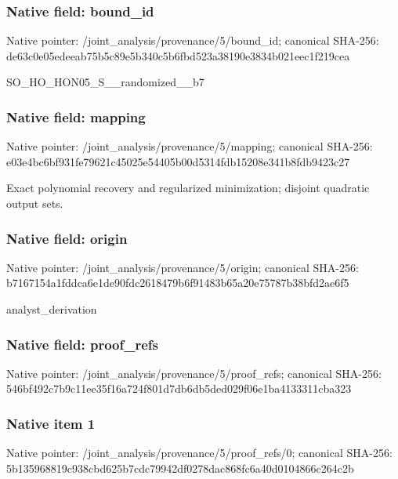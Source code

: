 \documentclass[10pt,a4paper]{article}
\begin{document}
\subsubsection{Native field: bound\_\allowbreak{}id}
Native pointer: /joint\_\allowbreak{}analysis/provenance/5/bound\_\allowbreak{}id; canonical SHA-256: de63c0e05edeeab75b5c89e5b340c5b6fbd523a38190e3834b021eec1f219cea

\begingroup\raggedright\sloppy SO\_\allowbreak{}HO\_\allowbreak{}HON05\_\allowbreak{}S\_\allowbreak{}\_\allowbreak{}randomized\_\allowbreak{}\_\allowbreak{}b7\par\endgroup

\subsubsection{Native field: mapping}
Native pointer: /joint\_\allowbreak{}analysis/provenance/5/mapping; canonical SHA-256: e03e4bc6bf931fe79621c45025e54405b00d5314fdb15208e341b8fdb9423c27

\begingroup\raggedright\sloppy Exact polynomial recovery and regularized minimization;\allowbreak{} disjoint quadratic output sets.\par\endgroup

\subsubsection{Native field: origin}
Native pointer: /joint\_\allowbreak{}analysis/provenance/5/origin; canonical SHA-256: b7167154a1fddca6e1de90fdc2618479b6f91483b65a20e75787b38bfd2ae6f5

\begingroup\raggedright\sloppy analyst\_\allowbreak{}derivation\par\endgroup

\subsubsection{Native field: proof\_\allowbreak{}refs}
Native pointer: /joint\_\allowbreak{}analysis/provenance/5/proof\_\allowbreak{}refs; canonical SHA-256: 546bf492c7b9c11ee35f16a724f801d7db6db5ded029f06e1ba4133311cba323

\subsubsection{Native item 1}
Native pointer: /joint\_\allowbreak{}analysis/provenance/5/proof\_\allowbreak{}refs/0; canonical SHA-256: 5b135968819c938cbd625b7cdc79942df0278dac868fc6a40d0104866c264c2b
\end{document}
